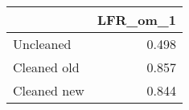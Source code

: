 \begin{tabular}{lr}
\toprule
{} & LFR_om_1 \\
\midrule
Uncleaned   &    0.498 \\
Cleaned old &    0.857 \\
Cleaned new &    0.844 \\
\bottomrule
\end{tabular}
